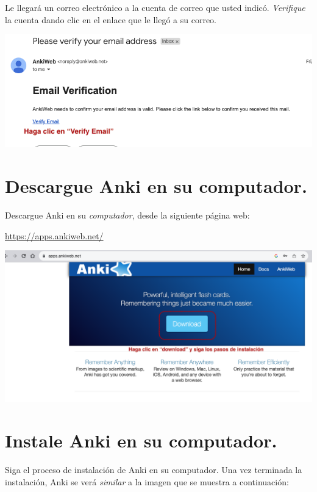 \documentclass[
]{book}
\begin{document}
Le llegará un correo electrónico a la cuenta de correo que usted indicó. \emph{Verifique} la cuenta dando clic en el enlace que le llegó a su correo.

\includegraphics[width=1\linewidth]{images/reposit_sp/email_verification}

\hypertarget{descargue-anki-en-su-computador.}{%
\section{Descargue Anki en su computador.}\label{descargue-anki-en-su-computador.}}

Descargue Anki en su \emph{computador}, desde la siguiente página web:

\url{https://apps.ankiweb.net/}

\includegraphics[width=1\linewidth]{images/reposit_sp/download}

\hypertarget{instale-anki-en-su-computador.}{%
\section{Instale Anki en su computador.}\label{instale-anki-en-su-computador.}}

Siga el proceso de instalación de Anki en su computador. Una vez terminada la instalación, Anki se verá \emph{similar} a la imagen que se muestra a continuación:
\end{document}
